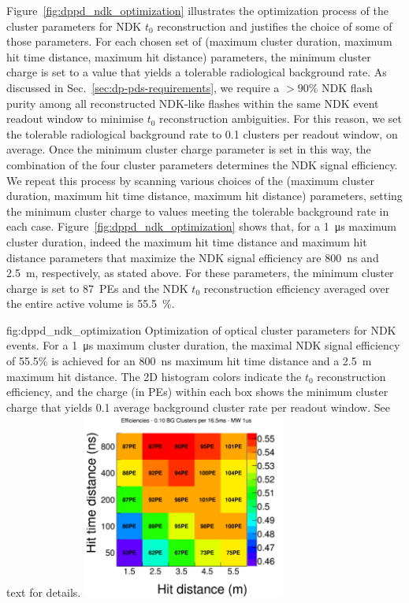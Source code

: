 Figure~\ref{fig:dppd_ndk_optimization} illustrates the optimization process of the cluster parameters for NDK $t_{0}$ reconstruction and justifies the choice of some of those parameters. For each chosen set of (maximum cluster duration, maximum hit time distance, maximum hit distance) parameters, the minimum cluster charge is set to a value that yields a tolerable radiological background rate. As discussed in Sec.~\ref{sec:dp-pds-requirements}, we require a $>90\%$ NDK flash purity among all reconstructed NDK-like flashes within the same NDK event readout window to minimise $t_0$ reconstruction ambiguities. For this reason, we set the tolerable radiological background rate to 0.1 clusters per readout window, on average. Once the minimum cluster charge parameter is set in this way, the combination of the four cluster parameters determines the NDK signal efficiency. We repeat this process by scanning various choices of the (maximum cluster duration, maximum hit time distance, maximum hit distance) parameters, setting the minimum cluster charge to values meeting the tolerable background rate in each case. Figure~\ref{fig:dppd_ndk_optimization} shows that, for a \SI{1}{\micro\s} maximum cluster duration, indeed the maximum hit time distance and maximum hit distance parameters that maximize the NDK signal efficiency are \SI{800}{\ns} and \SI{2.5}{\m}, respectively, as stated above. For these parameters, the minimum cluster charge is set to \SI{87}{PEs} and the NDK $t_0$ reconstruction efficiency averaged over the entire  active volume is \SI{55.5}{\%}.

\begin{dunefigure}{fig:dppd_ndk_optimization}
     {Optimization of optical cluster parameters for NDK events. For a \SI{1}{\us} maximum cluster duration, the maximal NDK signal efficiency of \num{55.5}\% is achieved for an \SI{800}{\ns} maximum hit time distance and a \SI{2.5}{\m} maximum hit distance. The 2D histogram colors indicate the $t_0$ reconstruction efficiency, and the charge (in PEs) within each box shows the minimum cluster charge that yields \num{0.1} average background cluster rate per readout window. See text for details.}
    \includegraphics[width=0.5\textwidth]{graphics/dppd_ndk_optimization.pdf}
    \end{dunefigure}

